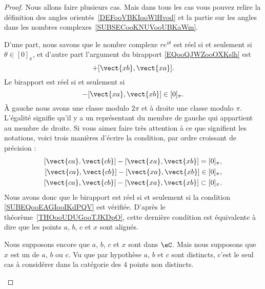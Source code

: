\begin{proof}
	Nous allons faire plusieurs cas. Mais dans tous les cas vous pouvez relire la définition des angles orientés~\ref{DEFooVBKIooWlHvod} et la partie sur les angles dans les nombres complexes~\ref{SUBSECooKNUVooUBKaWm}.
	\begin{subproof}

		D'une part, nous savons que le nombre complexe \( r e^{i\theta}\) est réel si et seulement si \( \theta\in[0]_{\pi}\), et d'autre part l'argument du birapport \eqref{EQooQJWZooOXKslh} est
		\begin{equation}
			[\vect{ ca },\vect{ cb }]+[\vect{ xb },\vect{ xa }].
		\end{equation}
		Le birapport est réel si et seulement si
		\begin{equation}
			[\vect{ ca },\vect{ cb }]-[\vect{ xa },\vect{ xb }]\in[0]_{\pi}.
		\end{equation}
		À gauche nous avons une classe modulo \( 2\pi\) et à droite une classe modulo \( \pi\). L'égalité signifie qu'il y a un représentant du membre de gauche qui appartient au membre de droite. Si vous aimez faire très attention à ce que signifient les notations, voici trois manières d'écrire la condition, par ordre croissant de précision :
		\begin{subequations}
			\begin{align}
				[\vect{ ca },\vect{ cb }]-[\vect{ xa },\vect{ xb }]=[0]_{\pi},   \\
				[\vect{ ca },\vect{ cb }]-[\vect{ xa },\vect{ xb }]\in[0]_{\pi}, \\
				[\vect{ ca },\vect{ cb }]-[\vect{ xa },\vect{ xb }]\subset[0]_{\pi}.        \label{SUBEQooEAGIooIKdPQV}
			\end{align}
		\end{subequations}
		Nous avons donc que le birapport est réel si et seulement si la condition \eqref{SUBEQooEAGIooIKdPQV} est vérifiée. D'après le théorème~\ref{THOooUDUGooTJKDpO}, cette dernière condition est équivalente à dire que les points \( a\), \( b\), \( c\) et \( x\) sont alignés.


		Nous supposons encore que \( a\), \( b\), \( c\) et \( x\) sont dans \( \eC\). Mais nous supposons que \( x\) est un de \( a\), \( b\) ou \( c\). Vu que par hypothèse \( a\), \( b\) et \( c\) sont distincts, c'est le seul cas à considérer dans la catégorie des \( 4\) points non distincts.


\end{subproof}
\end{proof}
